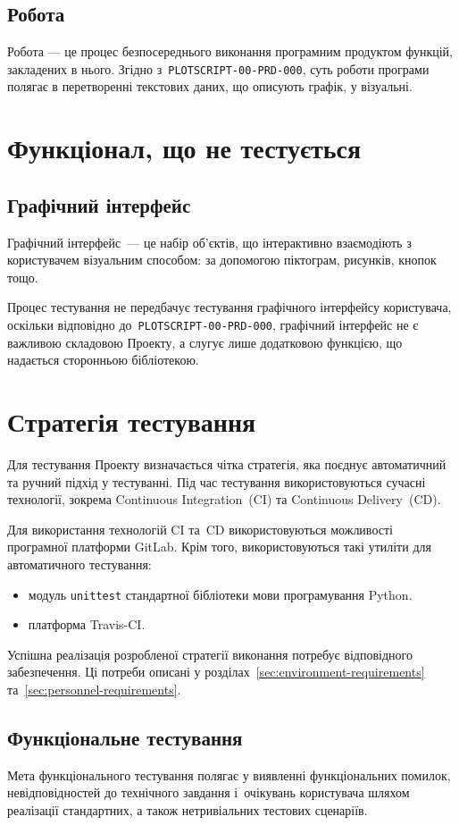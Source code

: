 \documentclass[a4paper,oneside,DIV=12,12pt]{scrartcl}
\newcommand{\theprdcode}{PLOTSCRIPT-00-PRD-000}
\newcommand{\printprdcode}{\texttt{\theprdcode}}
\newcommand{\module}[1]{\texttt{#1}}
\begin{document}
		\subsection{Робота}
			Робота --- це процес безпосереднього виконання програмним продуктом функцій, закладених в нього. Згідно з~\printprdcode, суть роботи програми полягає в перетворенні текстових даних, що описують графік, у візуальні.
			
	\section{Функціонал, що не тестується}
		\subsection{Графічний інтерфейс}
			Графічний інтерфейс~— це набір об'єктів, що інтерактивно взаємодіють з користувачем візуальним способом: за допомогою піктограм, рисунків, кнопок тощо.
			
			Процес тестування не передбачує тестування графічного інтерфейсу користувача, оскільки відповідно до~\printprdcode, графічний інтерфейс не є важливою складовою Проекту, а слугує лише додатковою функцією, що надається сторонньою бібліотекою.
	
	\section{Стратегія тестування}
		Для тестування Проекту визначається чітка стратегія, яка поєднує автоматичний та ручний підхід у тестуванні. Під час тестування використовуються сучасні технології, зокрема Continuous Integration~(CI) та Continuous Delivery~(CD).
		
		Для використання технологій CI та~CD використовуються можливості програмної платформи GitLab. Крім того, використовуються такі утиліти для автоматичного тестування:
		\begin{itemize}
			\item модуль \module{unittest} стандартної бібліотеки мови програмування Python.
			\item платформа Travis-CI.
		\end{itemize}
		
		Успішна реалізація розробленої стратегії виконання потребує відповідного забезпечення. Ці потреби описані у розділах~\ref{sec:environment-requirements} та~\ref{sec:personnel-requirements}.
		
		\subsection{Функціональне тестування}
			Мета функціонального тестування полягає у виявленні функціональних помилок, невідповідностей до технічного завдання і~очікувань користувача шляхом реалізації стандартних, а також нетривіальних тестових сценаріїв.
			
\end{document}
